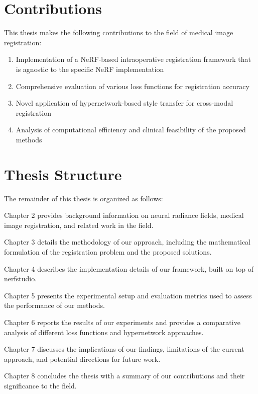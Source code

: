 \section{Contributions}
This thesis makes the following contributions to the field of medical image registration:

\begin{enumerate}
    \item Implementation of a NeRF-based intraoperative registration framework that is agnostic to the specific NeRF implementation
    \item Comprehensive evaluation of various loss functions for registration accuracy
    \item Novel application of hypernetwork-based style transfer for cross-modal registration
    \item Analysis of computational efficiency and clinical feasibility of the proposed methods
\end{enumerate}

\section{Thesis Structure}
The remainder of this thesis is organized as follows:

Chapter 2 provides background information on neural radiance fields, medical image registration, and related work in the field.

Chapter 3 details the methodology of our approach, including the mathematical formulation of the registration problem and the proposed solutions.

Chapter 4 describes the implementation details of our framework, built on top of nerfstudio.

Chapter 5 presents the experimental setup and evaluation metrics used to assess the performance of our methods.

Chapter 6 reports the results of our experiments and provides a comparative analysis of different loss functions and hypernetwork approaches.

Chapter 7 discusses the implications of our findings, limitations of the current approach, and potential directions for future work.

Chapter 8 concludes the thesis with a summary of our contributions and their significance to the field. 